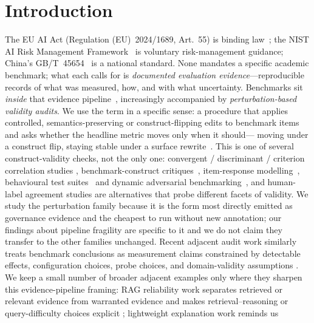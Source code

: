 \section{Introduction}
\label{sec:intro}

The EU AI Act (Regulation (EU)~2024/1689, Art.~55) is binding
law~\cite{eu_ai_act}; the NIST AI Risk Management
Framework~\cite{nist_ai_rmf} is voluntary risk-management guidance;
China's GB/T~45654~\cite{china_gbt_45654} is a national standard.
None mandates a specific academic benchmark; what each calls for is
\emph{documented evaluation evidence}---reproducible records of what
was measured, how, and with what uncertainty. Benchmarks sit
\emph{inside} that evidence pipeline~\cite{reuel2024open}, increasingly
accompanied by \emph{perturbation-based validity audits}. We use the
term in a specific sense: a procedure that applies controlled,
semantics-preserving or construct-flipping edits to benchmark items
and asks whether the headline metric moves only when it should---
moving under a construct flip, staying stable under a surface
rewrite~\cite{sclar2024quantifying, mizrahi2024state,
alzahrani2024benchmarks, ribeiro2020checklist}.
This is one of several construct-validity checks, not the only one:
convergent / discriminant / criterion correlation studies
\cite{cronbach1955construct, messick1995validity,
jacobs2021measurement, blodgett2021stereotyping}, benchmark-construct
critiques~\cite{raji2021ai}, item-response
modelling~\cite{lalor2019learning, vania2021comparing}, behavioural
test suites~\cite{ribeiro2020checklist} and dynamic adversarial
benchmarking~\cite{kiela2021dynabench}, and human-label agreement
studies are alternatives that probe different facets of validity. We study the
perturbation family because it is the form most directly emitted as
governance evidence and the cheapest to run without new annotation;
our findings about pipeline fragility are specific to it and we do
not claim they transfer to the other families unchanged. Recent
adjacent audit work similarly treats benchmark conclusions as
measurement claims constrained by detectable effects, configuration
choices, probe choices, and domain-validity assumptions
\cite{zhuang2026preregistering,li2026safetyrepro,li2026auditing,
wang2026auditing}. We keep a small number of broader adjacent
examples only where they sharpen this evidence-pipeline framing:
RAG reliability work separates retrieved or relevant evidence from
warranted evidence and makes retrieval--reasoning or query-difficulty
choices explicit
\cite{chen2026doesragknowretrieval,
qian2026relevantwarrantedevidenceforcecalibration,
ji2026retrieval,ji2025mrag}; lightweight explanation work reminds us

